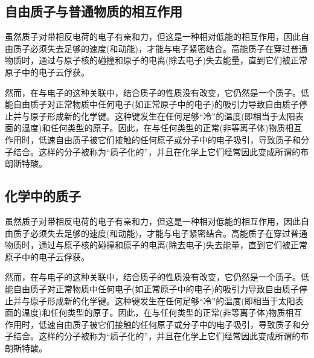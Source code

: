 \subsection{自由质子与普通物质的相互作用}
虽然质子对带相反电荷的电子有亲和力，但这是一种相对低能的相互作用，因此自由质子必须失去足够的速度(和动能)，才能与电子紧密结合。高能质子在穿过普通物质时，通过与原子核的碰撞和原子的电离(除去电子)失去能量，直到它们被正常原子中的电子云俘获。

然而，在与电子的这种关联中，结合质子的性质没有改变，它仍然是一个质子。低能自由质子对正常物质中任何电子(如正常原子中的电子)的吸引力导致自由质子停止并与原子形成新的化学键。这种键发生在任何足够“冷”的温度(即相当于太阳表面的温度)和任何类型的原子。因此，在与任何类型的正常(非等离子体)物质相互作用时，低速自由质子被它们接触的任何原子或分子中的电子吸引，导致质子和分子结合。这样的分子被称为“质子化的”，并且在化学上它们经常因此变成所谓的布朗斯特酸。

\subsection{化学中的质子}
虽然质子对带相反电荷的电子有亲和力，但这是一种相对低能的相互作用，因此自由质子必须失去足够的速度(和动能)，才能与电子紧密结合。高能质子在穿过普通物质时，通过与原子核的碰撞和原子的电离(除去电子)失去能量，直到它们被正常原子中的电子云俘获。

然而，在与电子的这种关联中，结合质子的性质没有改变，它仍然是一个质子。低能自由质子对正常物质中任何电子(如正常原子中的电子)的吸引力导致自由质子停止并与原子形成新的化学键。这种键发生在任何足够“冷”的温度(即相当于太阳表面的温度)和任何类型的原子。因此，在与任何类型的正常(非等离子体)物质相互作用时，低速自由质子被它们接触的任何原子或分子中的电子吸引，导致质子和分子结合。这样的分子被称为“质子化的”，并且在化学上它们经常因此变成所谓的布朗斯特酸。






